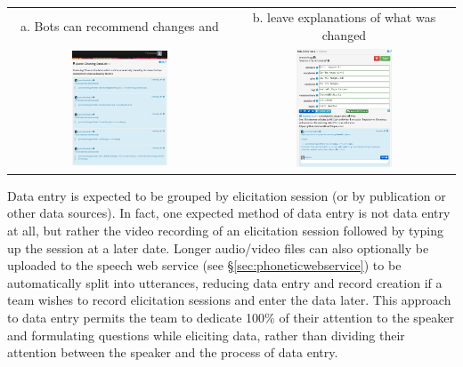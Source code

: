 \documentclass[letterpaper, 12pt, dvips]{mitwpl}
\begin{document}
\begin{exe} 
\ex \label{ex:bots}  ~  \\ 
 \begin{tabular}{c c} 
 a.  Bots can recommend changes and & b.  leave explanations of what was changed \\
   \includegraphics[width=0.45\textwidth]{cleaningBotsDatalist} &
   \includegraphics[width=0.45\textwidth]{cleaningBotCameBy}
\end{tabular}
\end{exe}



Data entry is expected to be grouped by elicitation session (or by publication or other data sources).
In fact,
one expected method of data entry is not data entry at all,
but rather the video recording of an elicitation session followed by typing up the session at a later date.
Longer audio/video files can also optionally be uploaded to the speech web service (see \S \ref{sec:phoneticwebservice}) to be automatically split into utterances,
 reducing data entry and record creation if a team wishes to record elicitation sessions and enter the data later.
 This approach to data entry permits the team to dedicate 100\% of their attention to the speaker and formulating questions while eliciting data,
rather than dividing their attention between the speaker and the process of data entry.
\end{document}
